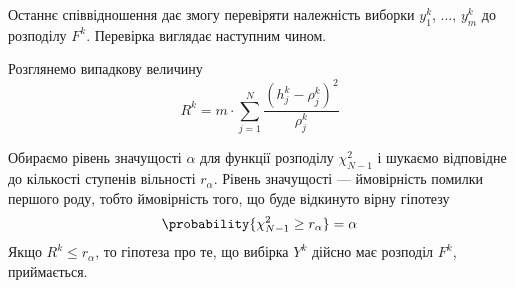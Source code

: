 Останнє співвідношення дає змогу перевіряти належність виборки
$y_1^k$, $\dots$, $y_m^k$ до розподілу $F^k$.
Перевірка виглядає наступним чином.

Розглянемо випадкову величину
\begin{equation}\label{eq:pearson:Rk}
  R^k
  = m \cdot \sum_{j=1}^{N}\frac{\left( h_j^k - \rho_j^k \right)^2}{\rho_j^k}
\end{equation}

Обираємо рівень значущості $\alpha$ для функції розподілу $\chi_{N-1}^2$ і
шукаємо відповідне до кількості ступенів вільності $r_{\alpha}$.
Рівень значущості --- ймовірність помилки першого роду, тобто ймовірність того,
що буде відкинуто вірну гіпотезу
\begin{equation*}
  \probability{\chi_{N-1}^2 \ge r_{\alpha}} = \alpha
\end{equation*}
Якщо $R^k \le r_{\alpha}$, то гіпотеза про те, що вибірка $Y^k$ дійсно має
розподіл $F^k$, приймається.

